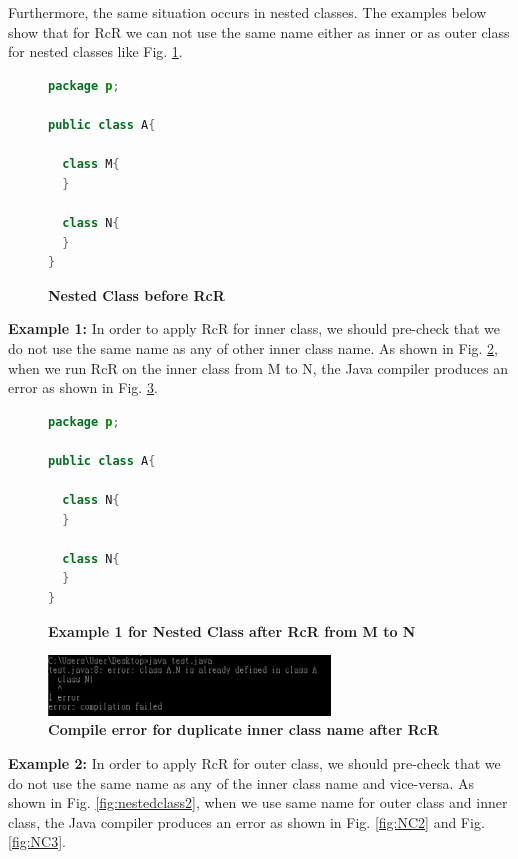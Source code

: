 Furthermore, the same situation occurs in nested classes. The examples below show that for RcR we can not use the same name either as inner or as outer class for nested classes like Fig. \ref{fig:original}.

\begin{figure}[th]
\centering
\begin{minipage}[t]{0.5\linewidth}
\begin{lstlisting}[language=java, basicstyle=\scriptsize\ttfamily,frame=single]
package p;

public class A{	

  class M{
  }

  class N{
  }
} 
\end{lstlisting}
\end{minipage}
\caption{\textbf{Nested Class before RcR}}
\label{fig:original}
\end{figure}

\textbf{Example 1:} In order to apply RcR for inner class, we should pre-check that we do not use the same name as any of other inner class name. As shown in Fig. \ref{fig:nestedclass1}, when we run RcR on the inner class from M to N, the Java compiler produces an error as shown in Fig. \ref{fig:NC1}.

\begin{figure}[th]
\centering
\begin{minipage}[t]{0.5\linewidth}
\begin{lstlisting}[language=java, basicstyle=\scriptsize\ttfamily,frame=single]
package p;

public class A{	
    
  class N{
  }
    
  class N{
  }
} 
\end{lstlisting}
\end{minipage}
\caption{\textbf{Example 1 for Nested Class after RcR from M to N}}
\label{fig:nestedclass1}
\end{figure}

\begin{figure}[H]
\centerline{\includegraphics[width=75mm,scale=0.4]{NC1.jpg}}
\caption{\textbf{Compile error for duplicate inner class name after RcR}}
\label{fig:NC1}
\end{figure}

\textbf{Example 2:} In order to apply RcR for outer class, we should pre-check that we do not use the same name as any of the inner class name and vice-versa. As shown in Fig. \ref{fig:nestedclass2}, when we use same name for outer class and inner class, the Java compiler produces an error as shown in Fig. \ref{fig:NC2} and Fig. \ref{fig:NC3}.

